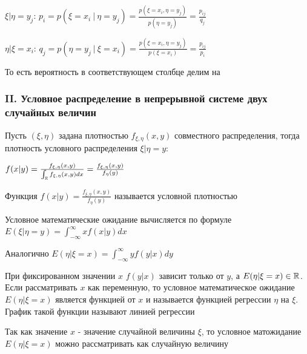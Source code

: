 \documentclass[12pt]{article}
\begin{document}
    $\xi | \eta = y_j$: $p_i = p(\xi = x_i \ | \ \eta = y_j) = \frac{p(\xi = x_i, \eta = y_j)}{p(\eta = y_j)} = \frac{p_{ij}}{q_j}$

    $\eta | \xi = x_i$: $q_j = p(\eta = y_j \ | \ \xi = x_i) = \frac{p(\xi = x_i, \eta = y_j)}{p(\xi = x_i)} = \frac{p_{ij}}{p_i}$

    То есть вероятность в соответствующем столбце делим на 

    \subsubsection{II. Условное распределение в непрерывной системе двух случайных величин}

    Пусть $(\xi, \eta)$ задана плотностью $f_{\xi, \eta}(x, y)$ совместного распределения, тогда плотность 
    условного распределения $\xi | \eta = y$: 

    $f(x | y) = \frac{f_{\xi, \eta}(x, y)}{\int_{\mathbb{R}} f_{\xi, \eta}(x, y)dx} = \frac{f_{\xi, \eta}(x, y)}{f_{\eta}(y)}$

    \Def Функция $f(x | y) = \frac{f_{\xi, \eta}(x, y)}{f_{\eta}(y)}$ называется условной плотностью

    \Def Условное математические ожидание вычисляется по формуле $E(\xi | \eta = y) = \int_{-\infty}^\infty xf(x | y)dx$

    Аналогично $E(\eta | \xi = x) = \int_{-\infty}^\infty yf(y | x)dy$

    \Nota При фиксированном значении $x$ $f(y | x)$ зависит только от $y$, а $E(\eta | \xi = x) \in \mathbb{R}$. 
    Если рассматривать $x$ как переменную, то условное математическое ожидание $E(\eta | \xi = x)$ является
    функцией от $x$ и называется функцией регрессии $\eta$ на $\xi$. График такой функции называют линией регрессии

    \Nota Так как значение $x$ - значение случайной величины $\xi$, то условное матожидание $E(\eta | \xi = x)$ 
    можно рассматривать как случайную величину
\end{document}

